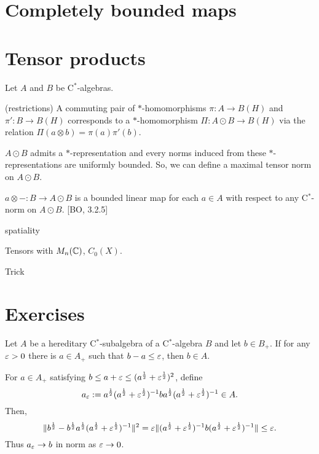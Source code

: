 \documentclass{../../large}
\begin{document}
\section{Completely bounded maps}




\section{Tensor products}

\begin{prb}
Let $A$ and $B$ be C$^*$-algebras.
\begin{parts}
\item (restrictions) A commuting pair of $*$-homomorphisms $\pi:A\to B(H)$ and $\pi':B\to B(H)$ corresponds to a $*$-homomorphism $\Pi:A\odot B\to B(H)$ via the relation $\Pi(a\otimes b)=\pi(a)\pi'(b)$.
\item $A\odot B$ admits a $*$-representation and every norms induced from these $*$-representations are uniformly bounded. So, we can define a maximal tensor norm on $A\odot B$.
\item $a\otimes-:B\to A\odot B$ is a bounded linear map for each $a\in A$ with respect to any C$^*$-norm on $A\odot B$. [BO, 3.2.5]
\end{parts}
\end{prb}


\begin{prb}
spatiality
\end{prb}
\begin{prb}
\end{prb}

Tensors with $M_n(\mathbb{C})$, $C_0(X)$.


\begin{prb}
\end{prb}

Trick

\section*{Exercises}
\begin{prb}
Let $A$ be a hereditary C$^*$-subalgebra of a C$^*$-algebra $B$ and let $b\in B_+$.
If for any $\varepsilon>0$ there is $a\in A_+$ such that $b-a\le\varepsilon$, then $b\in A$.
\end{prb}
\begin{pf}
For $a\in A_+$ satisfying $b\le a+\varepsilon\le(a^{\frac12}+\varepsilon^{\frac12})^2$, define
\[a_\varepsilon:=a^{\frac12}(a^{\frac12}+\varepsilon^{\frac12})^{-1}ba^{\frac12}(a^{\frac12}+\varepsilon^{\frac12})^{-1}\in A.\]
Then, 
\[\|b^{\frac12}-b^{\frac12}a^{\frac12}(a^{\frac12}+\varepsilon^{\frac12})^{-1}\|^2=\varepsilon\|(a^{\frac12}+\varepsilon^{\frac12})^{-1}b(a^{\frac12}+\varepsilon^{\frac12})^{-1}\|\le\varepsilon.\]
Thus $a_\varepsilon\to b$ in norm as $\varepsilon\to0$.
\end{pf}
\end{document}
